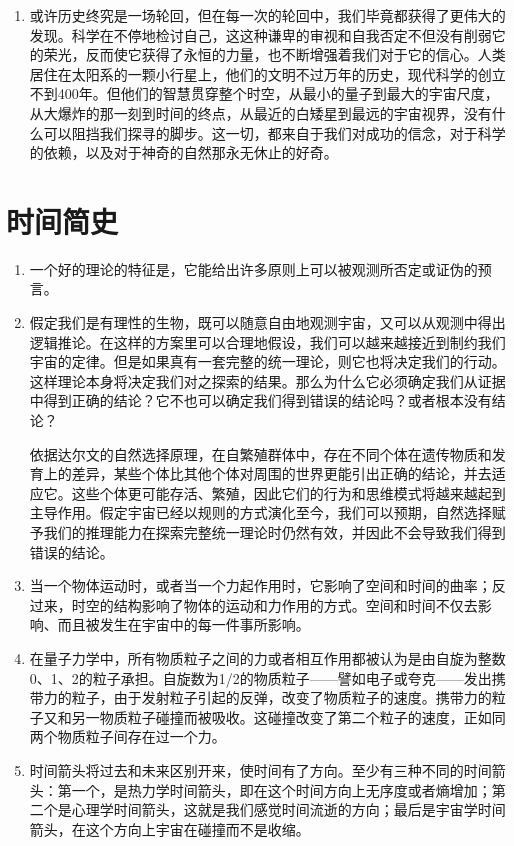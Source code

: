 \documentclass[UTF8]{ctexart}
\begin{document}
\begin{enumerate}
			\item 或许历史终究是一场轮回，但在每一次的轮回中，我们毕竟都获得了更伟大的发现。科学在不停地检讨自己，这这种谦卑的审视和自我否定不但没有削弱它的荣光，反而使它获得了永恒的力量，也不断增强着我们对于它的信心。人类居住在太阳系的一颗小行星上，他们的文明不过万年的历史，现代科学的创立不到400年。但他们的智慧贯穿整个时空，从最小的量子到最大的宇宙尺度，从大爆炸的那一刻到时间的终点，从最近的白矮星到最远的宇宙视界，没有什么可以阻挡我们探寻的脚步。这一切，都来自于我们对成功的信念，对于科学的依赖，以及对于神奇的自然那永无休止的好奇。	
			
		\end{enumerate}

	\newpage
	
	\section{时间简史}
	
		
		\begin{enumerate}
			\item 一个好的理论的特征是，它能给出许多原则上可以被观测所否定或证伪的预言。
			
			\item 假定我们是有理性的生物，既可以随意自由地观测宇宙，又可以从观测中得出逻辑推论。在这样的方案里可以合理地假设，我们可以越来越接近到制约我们宇宙的定律。但是如果真有一套完整的统一理论，则它也将决定我们的行动。这样理论本身将决定我们对之探索的结果。那么为什么它必须确定我们从证据中得到正确的结论？它不也可以确定我们得到错误的结论吗？或者根本没有结论？
			
			依据达尔文的自然选择原理，在自繁殖群体中，存在不同个体在遗传物质和发育上的差异，某些个体比其他个体对周围的世界更能引出正确的结论，并去适应它。这些个体更可能存活、繁殖，因此它们的行为和思维模式将越来越起到主导作用。假定宇宙已经以规则的方式演化至今，我们可以预期，自然选择赋予我们的推理能力在探索完整统一理论时仍然有效，并因此不会导致我们得到错误的结论。
			
			\item 当一个物体运动时，或者当一个力起作用时，它影响了空间和时间的曲率；反过来，时空的结构影响了物体的运动和力作用的方式。空间和时间不仅去影响、而且被发生在宇宙中的每一件事所影响。
			
			\item 在量子力学中，所有物质粒子之间的力或者相互作用都被认为是由自旋为整数0、1、2的粒子承担。自旋数为1/2的物质粒子——譬如电子或夸克——发出携带力的粒子，由于发射粒子引起的反弹，改变了物质粒子的速度。携带力的粒子又和另一物质粒子碰撞而被吸收。这碰撞改变了第二个粒子的速度，正如同两个物质粒子间存在过一个力。
			
			\item 时间箭头将过去和未来区别开来，使时间有了方向。至少有三种不同的时间箭头：第一个，是热力学时间箭头，即在这个时间方向上无序度或者熵增加；第二个是心理学时间箭头，这就是我们感觉时间流逝的方向；最后是宇宙学时间箭头，在这个方向上宇宙在碰撞而不是收缩。
			
		\end{enumerate}
	
\end{document}
